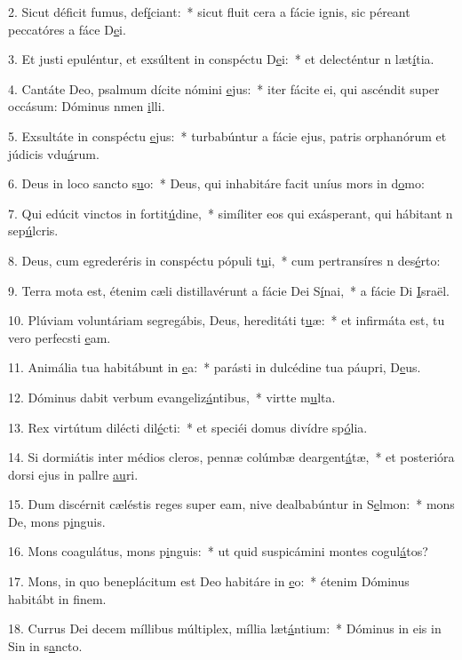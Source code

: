 2. Sicut déficit fumus, def\uline{í}ciant:~* sicut fluit cera a fácie ignis, sic péreant peccatóres a fáce D\uline{e}i.\par 
3. Et justi epuléntur, et exsúltent in conspéctu D\uline{e}i:~* et delecténtur n læt\uline{í}tia.\par 
4. Cantáte Deo, psalmum dícite nómini \uline{e}jus:~* iter fácite ei, qui ascéndit super occásum: Dóminus nmen \uline{i}lli.\par 
5. Exsultáte in conspéctu \uline{e}jus:~* turbabúntur a fácie ejus, patris orphanórum et júdicis vdu\uline{á}rum.\par 
6. Deus in loco sancto s\uline{u}o:~* Deus, qui inhabitáre facit uníus mors in d\uline{o}mo:\par 
7. Qui edúcit vinctos in fortit\uline{ú}dine,~* simíliter eos qui exásperant, qui hábitant n sep\uline{ú}lcris.\par 
8. Deus, cum egrederéris in conspéctu pópuli t\uline{u}i,~* cum pertransíres n des\uline{é}rto:\par 
9. Terra mota est, étenim cæli distillavérunt a fácie Dei S\uline{í}nai,~* a fácie Di \uline{I}sraël.\par 
10. Plúviam voluntáriam segregábis, Deus, hereditáti t\uline{u}æ:~* et infirmáta est, tu vero perfecsti \uline{e}am.\par 
11. Animália tua habitábunt in \uline{e}a:~* parásti in dulcédine tua páupri, D\uline{e}us.\par 
12. Dóminus dabit verbum evangeliz\uline{á}ntibus,~* virtte m\uline{u}lta.\par 
13. Rex virtútum dilécti dil\uline{é}cti:~* et speciéi domus divídre sp\uline{ó}lia.\par 
14. Si dormiátis inter médios cleros, pennæ colúmbæ deargent\uline{á}tæ,~* et posterióra dorsi ejus in pallre \uline{au}ri.\par 
15. Dum discérnit cæléstis reges super eam, nive dealbabúntur in S\uline{e}lmon:~* mons De, mons p\uline{i}nguis.\par 
16. Mons coagulátus, mons p\uline{i}nguis:~* ut quid suspicámini montes cogul\uline{á}tos?\par 
17. Mons, in quo beneplácitum est Deo habitáre in \uline{e}o:~* étenim Dóminus habitábt in f\uline{i}nem.\par 
18. Currus Dei decem míllibus múltiplex, míllia læt\uline{á}ntium:~* Dóminus in eis in Sin in s\uline{a}ncto.\par 
